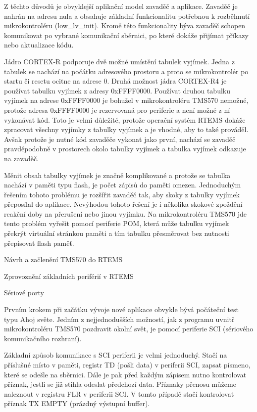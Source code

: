 	Z těchto důvodů je obvyklejší aplikační model zavaděč a aplikace. Zavaděč je nahrán na adresu nula a obsahuje základní funkcionalitu potřebnou k rozběhnutí mikrokontroléru (low\_lv\_init). Kromě této funkcionality býva zavaděč schopen komunikovat po vybrané komunikační sběrnici, po které dokáže přijímat příkazy nebo aktualizace kódu.
	
	Jádro CORTEX-R podporuje dvě možné umístění tabulek vyjímek. Jedna z tabulek se nachází na počátku adresového prostoru a proto se mikrokontrolér po startu či resetu ocitne na adrese 0. Druhá možnost jádra CORTEX-R4 je používat tabulku vyjímek z adresy 0xFFFF0000. Používat druhou tabulku vyjímek na adrese 0xFFFF0000 je bohužel v mikrokontroléru TMS570 nemožné, protože adresa 0xFFFF0000 je rezervovaná pro periferie a není možné z ní vykonávat kód. Toto je velmi důležité, protože operační systém RTEMS dokáže zpracovat všechny vyjímky z tabulky vyjímek a je vhodné, aby to také prováděl. Avšak protože je nutné kód zavaděče vykonat jako první, nachází se zavaděč pravděpodobně v prostorech okolo tabulky vyjímek a tabulka vyjímek odkazuje na zavaděč.

	Měnit obsah tabulky vyjímek je značně komplikované a protože se tabulka nachází v paměti typu flash, je počet zápisů do paměti omezen. Jednoduchým řešením tohoto problému je rozšířit zavaděč tak, aby skoky z tabulky vyjímek přeposílal do aplikace. Nevýhodou tohoto řešení je i několika skokové zpoždění reakční doby na přerušení nebo jinou vyjímku. Na mikrokontroléru TMS570 jde tento problém vyřešit pomocí periferie POM, která může tabulku vyjímek překrýt virtuální stránkou paměti a tím tabulku přesměrovat bez nutnosti přepisovat flash paměť. 
	 

\sec Návrh a začlenění TMS570 do RTEMS


\sec Zprovoznění základních periférií v RTEMS

\secc        Sériové porty

Prvním krokem při začátku vývoje nové aplikace obvykle bývá počáteční test typu Ahoj světe. Jedním z nejjednodušších možností, jak z programu uvnitř mikrokontroléru TMS570 pozdravit okolní svět, je pomocí periferie SCI (sériového komunikačního rozhraní).

Základní způsob komunikace s SCI periferii je velmi jednoduchý. Stačí na příslušné místo v paměti, registr TD (pošli data) v periferii SCI, zapsat písmeno, které se odešle na sběrnici. Dále je pak před každým zápisem nutno kontrolovat příznak, jestli se již stihla odeslat předchozí data. Příznaky přenosu můžeme naleznout v registru FLR v periferii SCI. V tomto případě stačí kontrolovat příznak TX EMPTY (prázdný výstupní buffer).

